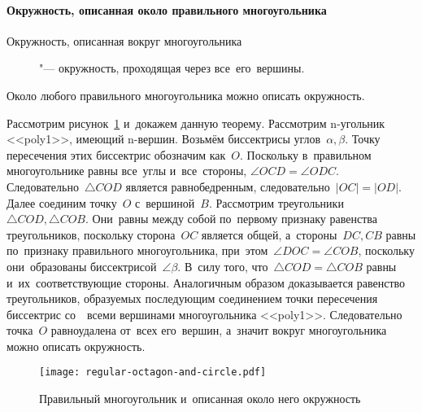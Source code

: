 \documentclass[]{scrartcl}
\begin{document}
\paragraph{Окружность, описанная около правильного многоугольника}\label{circle-around-polygon}
\begin{description}
	\item[Окружность, описанная вокруг многоугольника] "--- окружность, проходящая через все~его~вершины.
\end{description}

\begin{theorem}
	Около любого правильного многоугольника можно описать окружность.
\end{theorem}
Рассмотрим рисунок~\ref{fig:regular-octagon-and-circle} и~докажем данную теорему. Рассмотрим n-угольник <<poly1>>, имеющий n-вершин. Возьмём биссектрисы углов~${\textstyle \alpha, \beta}$. Точку пересечения этих биссектрис обозначим как~${\textstyle O}$. Поскольку в~правильном многоугольнике равны все~углы и~все~стороны, ${\textstyle \angle OCD = \angle ODC}$. Следовательно~${\textstyle \triangle COD}$ является равнобедренным, следовательно~${\textstyle |OC| = |OD|}$. Далее соединим точку~${\textstyle O}$ с~вершиной~${\textstyle B}$. Рассмотрим треугольники~${\textstyle \triangle COD, \triangle COB}$. Они~равны между собой по~первому признаку равенства треугольников, поскольку сторона~${\textstyle OC}$ является общей, а~стороны~${\textstyle DC,CB}$ равны по~признаку правильного многоугольника, при~этом~${\textstyle \angle DOC = \angle COB }$, поскольку они~образованы биссектрисой~${\textstyle \angle \beta}$. В~силу того, что~${\textstyle \triangle COD = \triangle COB}$ равны и~их~соответствующие стороны. Аналогичным образом доказывается равенство треугольников, образуемых последующим соединением точки пересечения биссектрис со~~всеми вершинами многоугольника <<poly1>>. Следовательно точка~${\textstyle O}$ равноудалена от~всех его~вершин, а~значит вокруг многоугольника можно описать окружность.
\begin{figure}[ht]
	\centering %
	\texttt{[image: regular-octagon-and-circle.pdf]}
	\caption{Правильный многоугольник и~описанная около него окружность}\label{fig:regular-octagon-and-circle}
\end{figure}
\end{document}
